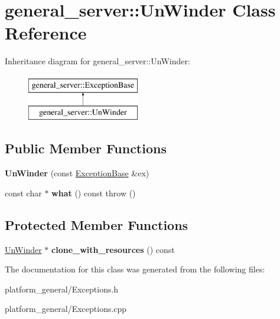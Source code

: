\hypertarget{classgeneral__server_1_1UnWinder}{\section{general\-\_\-server\-:\-:\-Un\-Winder \-Class \-Reference}
\label{classgeneral__server_1_1UnWinder}
}
\-Inheritance diagram for general\-\_\-server\-:\-:\-Un\-Winder\-:\begin{figure}[H]
\begin{center}
\leavevmode
\includegraphics[height=2.000000cm]{classgeneral__server_1_1UnWinder}
\end{center}
\end{figure}
\subsection*{\-Public \-Member \-Functions}
\begin{DoxyCompactItemize}
\item 
\hypertarget{classgeneral__server_1_1UnWinder_a11ab4239047e512c9d83ff6918056c2f}{{\bfseries \-Un\-Winder} (const \hyperlink{classgeneral__server_1_1ExceptionBase}{\-Exception\-Base} \&ex)}\label{classgeneral__server_1_1UnWinder_a11ab4239047e512c9d83ff6918056c2f}

\item 
\hypertarget{classgeneral__server_1_1UnWinder_ae0acfd3837777a373bc110f8fd6d3d99}{const char $\ast$ {\bfseries what} () const   throw ()}\label{classgeneral__server_1_1UnWinder_ae0acfd3837777a373bc110f8fd6d3d99}

\end{DoxyCompactItemize}
\subsection*{\-Protected \-Member \-Functions}
\begin{DoxyCompactItemize}
\item 
\hypertarget{classgeneral__server_1_1UnWinder_a42eca8e187e4b011102c58d19aaf977a}{\hyperlink{classgeneral__server_1_1UnWinder}{\-Un\-Winder} $\ast$ {\bfseries clone\-\_\-with\-\_\-resources} () const }\label{classgeneral__server_1_1UnWinder_a42eca8e187e4b011102c58d19aaf977a}

\end{DoxyCompactItemize}


\-The documentation for this class was generated from the following files\-:\begin{DoxyCompactItemize}
\item 
platform\-\_\-general/\-Exceptions.\-h\item 
platform\-\_\-general/\-Exceptions.\-cpp\end{DoxyCompactItemize}
